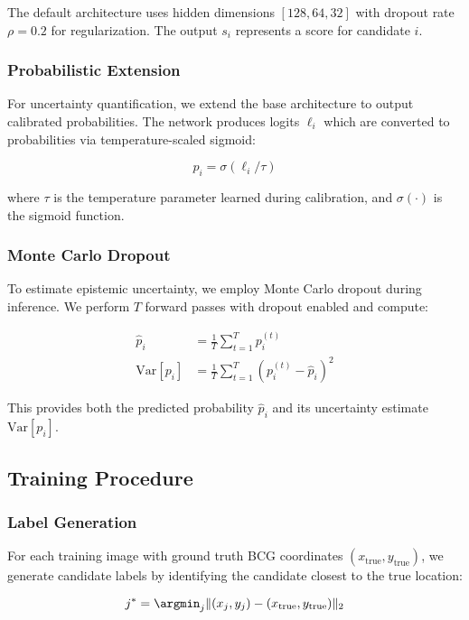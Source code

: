 \documentclass[twocolumn,10pt]{aastex631}
\begin{document}
The default architecture uses hidden dimensions $[128, 64, 32]$ with dropout rate $\rho = 0.2$ for regularization. The output $s_i$ represents a score for candidate $i$.

\subsubsection{Probabilistic Extension}
For uncertainty quantification, we extend the base architecture to output calibrated probabilities. The network produces logits $\ell_i$ which are converted to probabilities via temperature-scaled sigmoid:

\begin{equation}
p_i = \sigma(\ell_i / \tau)
\end{equation}

where $\tau$ is the temperature parameter learned during calibration, and $\sigma(\cdot)$ is the sigmoid function.

\subsubsection{Monte Carlo Dropout}
To estimate epistemic uncertainty, we employ Monte Carlo dropout during inference. We perform $T$ forward passes with dropout enabled and compute:

\begin{align}
\hat{p}_i &= \frac{1}{T} \sum_{t=1}^{T} p_i^{(t)} \\
\text{Var}[p_i] &= \frac{1}{T} \sum_{t=1}^{T} (p_i^{(t)} - \hat{p}_i)^2
\end{align}

This provides both the predicted probability $\hat{p}_i$ and its uncertainty estimate $\text{Var}[p_i]$.

\subsection{Training Procedure}

\subsubsection{Label Generation}
For each training image with ground truth BCG coordinates $(x_{\text{true}}, y_{\text{true}})$, we generate candidate labels by identifying the candidate closest to the true location:

\begin{equation}
j^* = \argmin_j \|(x_j, y_j) - (x_{\text{true}}, y_{\text{true}})\|_2
\end{equation}
\end{document}
